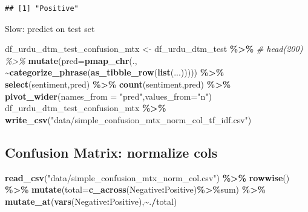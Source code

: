 \documentclass[
]{article}
\newenvironment{Shaded}{\begin{snugshade}}{\end{snugshade}}
\newcommand{\CommentTok}[1]{\textcolor[rgb]{0.56,0.35,0.01}{\textit{#1}}}
\newcommand{\DataTypeTok}[1]{\textcolor[rgb]{0.13,0.29,0.53}{#1}}
\newcommand{\KeywordTok}[1]{\textcolor[rgb]{0.13,0.29,0.53}{\textbf{#1}}}
\newcommand{\NormalTok}[1]{#1}
\newcommand{\OperatorTok}[1]{\textcolor[rgb]{0.81,0.36,0.00}{\textbf{#1}}}
\newcommand{\StringTok}[1]{\textcolor[rgb]{0.31,0.60,0.02}{#1}}
\begin{document}
\begin{verbatim}
## [1] "Positive"
\end{verbatim}

Slow: predict on test set

\begin{Shaded}
\begin{Highlighting}[]
\NormalTok{df\_urdu\_dtm\_test\_confusion\_mtx \textless{}{-}}\StringTok{ }\NormalTok{df\_urdu\_dtm\_test }\OperatorTok{\%\textgreater{}\%}
\StringTok{  }\CommentTok{\# head(200) \%\textgreater{}\%}
\StringTok{  }\KeywordTok{mutate}\NormalTok{(}\DataTypeTok{pred=}\KeywordTok{pmap\_chr}\NormalTok{(., }\OperatorTok{\textasciitilde{}}\KeywordTok{categorize\_phrase}\NormalTok{(}\KeywordTok{as\_tibble\_row}\NormalTok{(}\KeywordTok{list}\NormalTok{(...))))) }\OperatorTok{\%\textgreater{}\%}
\StringTok{  }\KeywordTok{select}\NormalTok{(sentiment,pred) }\OperatorTok{\%\textgreater{}\%}
\StringTok{  }\KeywordTok{count}\NormalTok{(sentiment,pred) }\OperatorTok{\%\textgreater{}\%}
\StringTok{  }\KeywordTok{pivot\_wider}\NormalTok{(}\DataTypeTok{names\_from =} \StringTok{"pred"}\NormalTok{,}\DataTypeTok{values\_from=}\StringTok{"n"}\NormalTok{)}
\NormalTok{df\_urdu\_dtm\_test\_confusion\_mtx }\OperatorTok{\%\textgreater{}\%}\StringTok{ }\KeywordTok{write\_csv}\NormalTok{(}\StringTok{"data/simple\_confusion\_mtx\_norm\_col\_tf\_idf.csv"}\NormalTok{)}
\end{Highlighting}
\end{Shaded}

\hypertarget{confusion-matrix-normalize-cols}{%
\subsection{Confusion Matrix: normalize
cols}\label{confusion-matrix-normalize-cols}}

\begin{Shaded}
\begin{Highlighting}[]
\KeywordTok{read\_csv}\NormalTok{(}\StringTok{"data/simple\_confusion\_mtx\_norm\_col.csv"}\NormalTok{) }\OperatorTok{\%\textgreater{}\%}
\StringTok{  }\KeywordTok{rowwise}\NormalTok{() }\OperatorTok{\%\textgreater{}\%}
\StringTok{  }\KeywordTok{mutate}\NormalTok{(}\DataTypeTok{total=}\KeywordTok{c\_across}\NormalTok{(Negative}\OperatorTok{:}\NormalTok{Positive)}\OperatorTok{\%\textgreater{}\%}\NormalTok{sum) }\OperatorTok{\%\textgreater{}\%}
\StringTok{  }\KeywordTok{mutate\_at}\NormalTok{(}\KeywordTok{vars}\NormalTok{(Negative}\OperatorTok{:}\NormalTok{Positive),}\OperatorTok{\textasciitilde{}}\NormalTok{.}\OperatorTok{/}\NormalTok{total)}
\end{Highlighting}
\end{Shaded}
\end{document}
